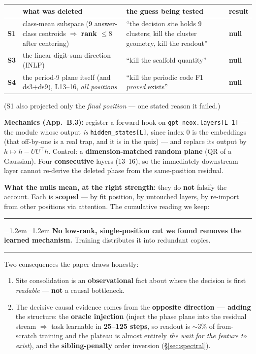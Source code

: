 \documentclass[11pt]{article}
\newenvironment{keybox}
  {\par\vspace{7pt}\noindent\hrule\vspace{5pt}%
   \begingroup\leftskip=1.2em\rightskip=1.2em\noindent\ignorespaces}
  {\par\endgroup\vspace{5pt}\hrule\vspace{7pt}}
\begin{document}
\begin{center}
\small
\begin{tabular}{@{}lp{4.6cm}p{4.6cm}l@{}}
\toprule
& \textbf{what was deleted} & \textbf{the guess being tested} & \textbf{result} \\
\midrule
\textbf{S1} & class-mean subspace (9 answer-class centroids $\Rightarrow$
  \textbf{rank $\le 8$} after centering) & ``the decision site holds 9 clusters;
  kill the cluster geometry, kill the readout'' & \textbf{null} \\
\textbf{S3} & the linear digit-sum direction (INLP) & ``kill the scaffold quantity''
  & \textbf{null} \\
\textbf{S4} & the period-9 plane itself (and ds3$+$ds9), L13--16, \emph{all
  positions} & ``kill the periodic code F1 \emph{proved} exists'' & \textbf{null} \\
\bottomrule
\end{tabular}
\end{center}

\noindent(S1 also projected only the \emph{final position} --- one stated reason
it failed.)

\textbf{Mechanics (App.~B.3):} register a forward hook on
\texttt{gpt\_neox.layers[L-1]} --- the module whose output \emph{is}
\texttt{hidden\_states[L]}, since index 0 is the embeddings (that off-by-one is a
real trap, and it is in the quiz) --- and replace its output by
$h \mapsto h - U U^\top h$. Control: a \textbf{dimension-matched random plane} (QR
of a Gaussian). Four \textbf{consecutive} layers (13--16), so the immediately
downstream layer cannot re-derive the deleted phase from the same-position residual.

\textbf{What the nulls mean, at the right strength:} they do \textbf{not} falsify
the account. Each is \textbf{scoped} --- by fit position, by untouched layers, by
re-import from other positions via attention. The cumulative reading we keep:

\begin{keybox}
\textbf{No low-rank, single-position cut we found removes the learned mechanism.}
Training distributes it into redundant copies.
\end{keybox}

Two consequences the paper draws honestly:
\begin{enumerate}[leftmargin=*,itemsep=2pt]
\item Site consolidation is an \textbf{observational} fact about where the decision
is first \emph{readable} --- \textbf{not} a causal bottleneck.
\item The decisive causal evidence comes from the \textbf{opposite direction ---
adding} the structure: the \textbf{oracle injection} (inject the phase plane into
the residual stream $\Rightarrow$ task learnable in \textbf{25--125 steps}, so
readout is $\sim$3\% of from-scratch training and the plateau is almost entirely
\emph{the wait for the feature to exist}), and the \textbf{sibling-penalty} order
inversion (\S\ref{sec:spectral}).
\end{enumerate}
\end{document}
